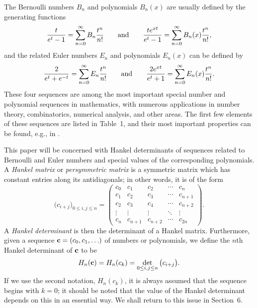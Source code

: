 \documentclass{amsart}
\theoremstyle{plain}
\numberwithin{equation}{section}
\begin{document}
The Bernoulli numbers $B_n$ and polynomials $B_n(x)$ are usually defined by 
the generating functions
\begin{equation}\label{1.1}
\frac{t}{e^t-1} = \sum_{n=0}^\infty B_n\frac{t^n}{n!}\qquad\hbox{and}\qquad
\frac{te^{xt}}{e^t-1} = \sum_{n=0}^\infty B_n(x)\frac{t^n}{n!},
\end{equation}
and the related  Euler numbers $E_n$ and polynomials $E_n(x)$ can be defined by 
\begin{equation}\label{1.2}
\frac{2}{e^t+e^{-t}} = \sum_{n=0}^\infty E_n\frac{t^n}{n!}\qquad\hbox{and}\qquad
\frac{2e^{xt}}{e^t+1} = \sum_{n=0}^\infty E_n(x)\frac{t^n}{n!}.
\end{equation}
These four sequences are 
among the most important special number and polynomial sequences in mathematics,
with numerous applications in number theory, combinatorics, numerical analysis,
and other areas. The first few elements of these sequences are listed in
Table~1, and their most important properties can be found, e.g., in 
\cite[Ch.~24]{DLMF}.

This paper will be concerned with Hankel determinants of sequences related to
Bernoulli and Euler numbers and special values of the corresponding polynomials.
A {\it Hankel matrix} or {\it persymmetric matrix} is a symmetric matrix which 
has constant entries along its antidiagonals; in other words, it is of the form
\begin{equation}\label{1.3}
\big(c_{i+j}\big)_{0\leq i,j\leq n}
=\begin{pmatrix}
c_{0} & c_{1} & c_{2} & \cdots & c_{n}\\
c_{1} & c_{2} & c_{3} & \cdots & c_{n+1}\\
c_{2} & c_{3} & c_{4} & \cdots & c_{n+2}\\
\vdots & \vdots & \vdots & \ddots & \vdots\\
c_{n} & c_{n+1} & c_{n+2} & \cdots & c_{2n}
\end{pmatrix}.
\end{equation}
A {\it Hankel determinant} is then the determinant of a Hankel matrix. 
Furthermore, given a sequence ${\bf c}=(c_0,c_1,\ldots)$ of numbers or 
polynomials, we define the $n$th Hankel determinant of ${\bf c}$ to be 
\begin{equation}\label{1.3a}
H_n({\bf c}) = H_n(c_k) = \det_{0\leq i,j\leq n}\big(c_{i+j}\big).
\end{equation}
If we use the second notation, $H_n(c_k)$, it is always assumed that the 
sequence begins with $k=0$; it should be noted that the value of the Hankel
determinant depends on this in an essential way. We shall return to this
issue in Section~6.
\end{document}
